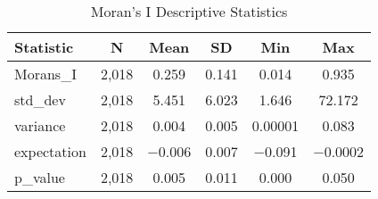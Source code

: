 \begin{table}[!htbp] 
  \centering 
  \caption{Moran's I Descriptive Statistics} 
  \label{moran_desc} 
  \begin{tabular}{|l|c|c|c|c|c|} 
      \hline 
      Statistic & N & Mean & SD & Min & Max \\ 
      \hline 
      Morans\_I & 2,018 & 0.259 & 0.141 & 0.014 & 0.935 \\ 
      \hline
      std\_dev & 2,018 & 5.451 & 6.023 & 1.646 & 72.172 \\ 
      \hline
      variance & 2,018 & 0.004 & 0.005 & 0.00001 & 0.083 \\
      \hline 
      expectation & 2,018 & $-$0.006 & 0.007 & $-$0.091 & $-$0.0002 \\ 
      \hline
      p\_value & 2,018 & 0.005 & 0.011 & 0.000 & 0.050 \\ 
      \hline 
  \end{tabular} 
\end{table}
